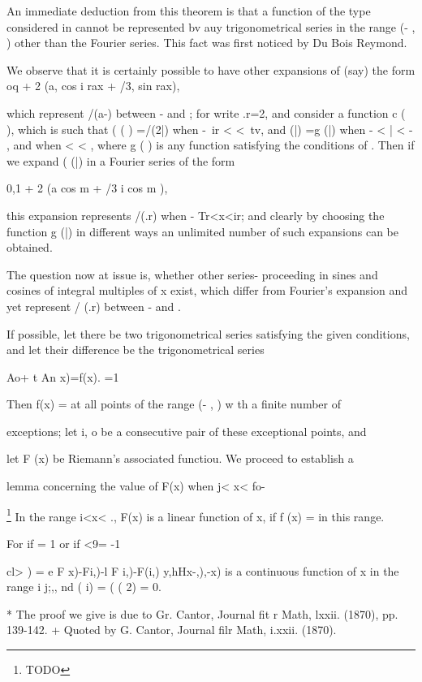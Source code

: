 An immediate deduction from this theorem is that a function of the
type considered in  cannot be represented bv auy trigonometrical
series in the range (- \pi, \pi) other than the Fourier series. This
fact was first noticed by Du Bois Reymond.

We observe that it is certainly possible to have other expansions of
(say) the form oq + 2 (a, cos i rax + /3, sin rax),

which represent /(a-) between - \pi and \pi; for write .r=2, and
consider a function c ( ), which is such that ( ( ) =/(2|) when -\ ir
< <\ tv, and (|) =g (|) when - \pi < | < - \pi, and when \pi < < \pi,
where g ( ) is any function satisfying the conditions of . Then
if we expand ( (|) in a Fourier series of the form

0,1 + 2 (a cos m + /3 i cos m ),

this expansion represents /(.r) when - Tr<x<ir; and clearly by
choosing the function g (|) in different ways an unlimited number of
such expansions can be obtained.

The question now at issue is, whether other series- proceeding in
sines and cosines of integral multiples of x exist, which differ from
Fourier's expansion and yet represent / (.r) between - \pi and \pi.

If possible, let there be two trigonometrical series satisfying the
given conditions, and let their difference be the trigonometrical
series

Ao+ t An x)=f(x). =1

Then f(x) = at all points of the range (- \pi, \pi) w th a finite number
of

exceptions; let i, o be a consecutive pair of these exceptional
points, and

let F (x) be Riemann's associated functiou. We proceed to establish a

lemma concerning the value of F(x) when j< x< fo-

\footnote{TODO} In the range i<x< ., F(x) is a linear
function of x, if f (x) = in this range.

For if = 1 or if <9= -1

cl> ) = e F x)-Fi,)-l F i,)-F(i,) y,hHx-,),-x) is a continuous
function of x in the range i j;,, nd ( i) = ( ( 2) = 0.

* The proof we give is due to Gr. Cantor, Journal fit r Math, lxxii.
(1870), pp. 139-142. + Quoted by G. Cantor, Journal filr Math, i.xxii.
(1870).


